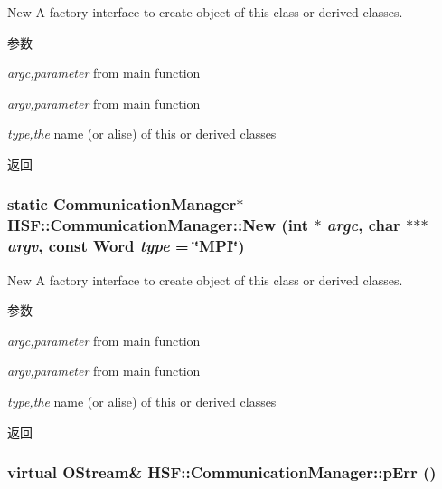 New A factory interface to create object of this class or derived classes. 
\begin{DoxyParams}{参数}
\item[{\em argc,parameter}]from main function \item[{\em argv,parameter}]from main function \item[{\em type,the}]name (or alise) of this or derived classes \end{DoxyParams}
\begin{DoxyReturn}{返回}

\end{DoxyReturn}
\hypertarget{classHSF_1_1CommunicationManager_a4ab7d9f97d7fe999a6b8173af7ff0dd7}{
\subsubsection[{New}]{\setlength{\rightskip}{0pt plus 5cm}static {\bf CommunicationManager}$\ast$ HSF::CommunicationManager::New (int $\ast$ {\em argc}, \/  char $\ast$$\ast$$\ast$ {\em argv}, \/  const Word {\em type} = {\ttfamily \char`\"{}MPI\char`\"{}})}}
\label{classHSF_1_1CommunicationManager_a4ab7d9f97d7fe999a6b8173af7ff0dd7}


New A factory interface to create object of this class or derived classes. 
\begin{DoxyParams}{参数}
\item[{\em argc,parameter}]from main function \item[{\em argv,parameter}]from main function \item[{\em type,the}]name (or alise) of this or derived classes \end{DoxyParams}
\begin{DoxyReturn}{返回}

\end{DoxyReturn}
\hypertarget{classHSF_1_1CommunicationManager_a416b9b36a5831fee0b931405bcad3e97}{
\subsubsection[{pErr}]{\setlength{\rightskip}{0pt plus 5cm}virtual {\bf OStream}\& HSF::CommunicationManager::pErr ()}}
\label{classHSF_1_1CommunicationManager_a416b9b36a5831fee0b931405bcad3e97}


